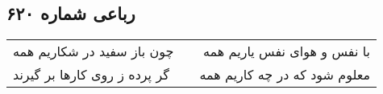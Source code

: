 \begin{center}
\section*{رباعی شماره ۶۲۰}
\label{sec:sh620}
\begin{longtable}{l p{0.5cm} r}
چون باز سفید در شکاریم همه
&&
با نفس و هوای نفس یاریم همه
\\
گر پرده ز روی کارها بر گیرند
&&
معلوم شود که در چه کاریم همه
\\
\end{longtable}
\end{center}
